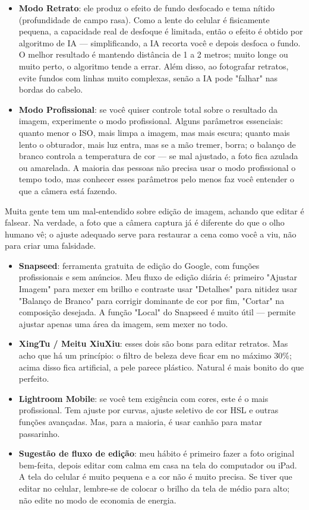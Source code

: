 \begin{itemize}
  \item \textbf{Modo Retrato}: ele produz o efeito de fundo desfocado e tema nítido (profundidade de campo rasa). Como a lente do celular é fisicamente pequena, a capacidade real de desfoque é limitada, então o efeito é obtido por algoritmo de IA — simplificando, a IA recorta você e depois desfoca o fundo. O melhor resultado é mantendo distância de 1 a 2 metros; muito longe ou muito perto, o algoritmo tende a errar. Além disso, ao fotografar retratos, evite fundos com linhas muito complexas, senão a IA pode "falhar" nas bordas do cabelo.
  \item \textbf{Modo Profissional}: se você quiser controle total sobre o resultado da imagem, experimente o modo profissional. Alguns parâmetros essenciais: quanto menor o ISO, mais limpa a imagem, mas mais escura; quanto mais lento o obturador, mais luz entra, mas se a mão tremer, borra; o balanço de branco controla a temperatura de cor — se mal ajustado, a foto fica azulada ou amarelada. A maioria das pessoas não precisa usar o modo profissional o tempo todo, mas conhecer esses parâmetros pelo menos faz você entender o que a câmera está fazendo.
\end{itemize}


Muita gente tem um mal-entendido sobre edição de imagem, achando que editar é falsear. Na verdade, a foto que a câmera captura já é diferente do que o olho humano vê; o ajuste adequado serve para restaurar a cena como você a viu, não para criar uma falsidade.

\begin{itemize}
  \item \textbf{Snapseed}: ferramenta gratuita de edição do Google, com funções profissionais e sem anúncios. Meu fluxo de edição diária é: primeiro "Ajustar Imagem" para mexer em brilho e contraste usar "Detalhes" para nitidez usar "Balanço de Branco" para corrigir dominante de cor por fim, "Cortar" na composição desejada. A função "Local" do Snapseed é muito útil — permite ajustar apenas uma área da imagem, sem mexer no todo.
  \item \textbf{XingTu / Meitu XiuXiu}: esses dois são bons para editar retratos. Mas acho que há um princípio: o filtro de beleza deve ficar em no máximo 30\%; acima disso fica artificial, a pele parece plástico. Natural é mais bonito do que perfeito.
  \item \textbf{Lightroom Mobile}: se você tem exigência com cores, este é o mais profissional. Tem ajuste por curvas, ajuste seletivo de cor HSL e outras funções avançadas. Mas, para a maioria, é usar canhão para matar passarinho.
  \item \textbf{Sugestão de fluxo de edição}: meu hábito é primeiro fazer a foto original bem-feita, depois editar com calma em casa na tela do computador ou iPad. A tela do celular é muito pequena e a cor não é muito precisa. Se tiver que editar no celular, lembre-se de colocar o brilho da tela de médio para alto; não edite no modo de economia de energia.
\end{itemize}

